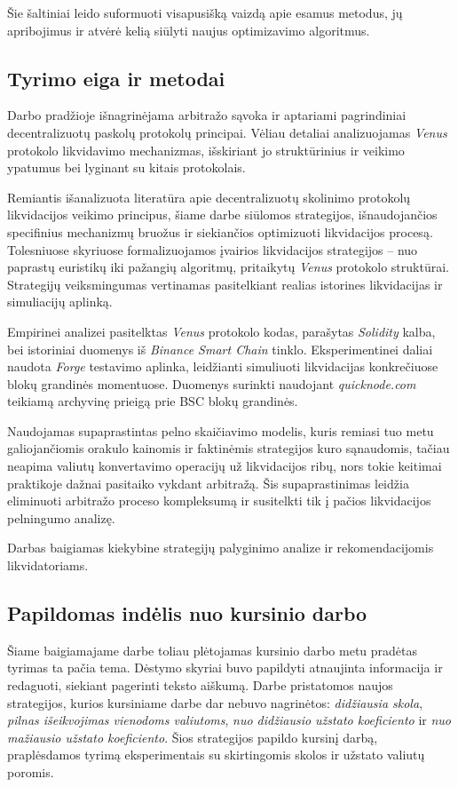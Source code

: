 \documentclass[]{VUMIFTemplateClass}
\begin{document}
Šie šaltiniai leido suformuoti visapusišką vaizdą apie esamus metodus, jų apribojimus ir atvėrė kelią siūlyti naujus optimizavimo algoritmus.

\subsection*{Tyrimo eiga ir metodai}
Darbo pradžioje išnagrinėjama arbitražo sąvoka ir aptariami pagrindiniai decentralizuotų paskolų protokolų principai. Vėliau detaliai analizuojamas \textit{Venus} protokolo likvidavimo mechanizmas, išskiriant jo struktūrinius ir veikimo ypatumus bei lyginant su kitais protokolais.

Remiantis išanalizuota literatūra apie decentralizuotų skolinimo protokolų likvidacijos veikimo principus, šiame darbe siūlomos strategijos, išnaudojančios specifinius mechanizmų bruožus ir siekiančios optimizuoti likvidacijos procesą. Tolesniuose skyriuose formalizuojamos įvairios likvidacijos strategijos – nuo paprastų euristikų iki pažangių algoritmų, pritaikytų \textit{Venus} protokolo struktūrai. Strategijų veiksmingumas vertinamas pasitelkiant realias istorines likvidacijas ir simuliacijų aplinką.

Empirinei analizei pasitelktas \textit{Venus} protokolo kodas, parašytas \textit{Solidity} kalba, bei istoriniai duomenys iš \textit{Binance Smart Chain} tinklo. Eksperimentinei daliai naudota \textit{Forge} testavimo aplinka, leidžianti simuliuoti likvidacijas konkrečiuose blokų grandinės momentuose. Duomenys surinkti naudojant \textit{quicknode.com} teikiamą archyvinę prieigą prie BSC blokų grandinės.

Naudojamas supaprastintas pelno skaičiavimo modelis, kuris remiasi tuo metu galiojančiomis orakulo kainomis ir faktinėmis strategijos kuro sąnaudomis, tačiau neapima valiutų konvertavimo operacijų už likvidacijos ribų, nors tokie keitimai praktikoje dažnai pasitaiko vykdant arbitražą. Šis supaprastinimas leidžia eliminuoti arbitražo proceso kompleksumą ir susitelkti tik į pačios likvidacijos pelningumo analizę.

Darbas baigiamas kiekybine strategijų palyginimo analize ir rekomendacijomis likvidatoriams.

\subsection*{Papildomas indėlis nuo kursinio darbo}
Šiame baigiamajame darbe toliau plėtojamas kursinio darbo metu pradėtas tyrimas ta pačia tema. Dėstymo skyriai buvo papildyti atnaujinta informacija ir redaguoti, siekiant pagerinti teksto aiškumą. Darbe pristatomos naujos strategijos, kurios kursiniame darbe dar nebuvo nagrinėtos: \textit{didžiausia skola}, \textit{pilnas išeikvojimas vienodoms valiutoms}, \textit{nuo didžiausio užstato koeficiento} ir \textit{nuo mažiausio užstato koeficiento}. Šios strategijos papildo kursinį darbą, praplėsdamos tyrimą eksperimentais su skirtingomis skolos ir užstato valiutų poromis.
\end{document}
